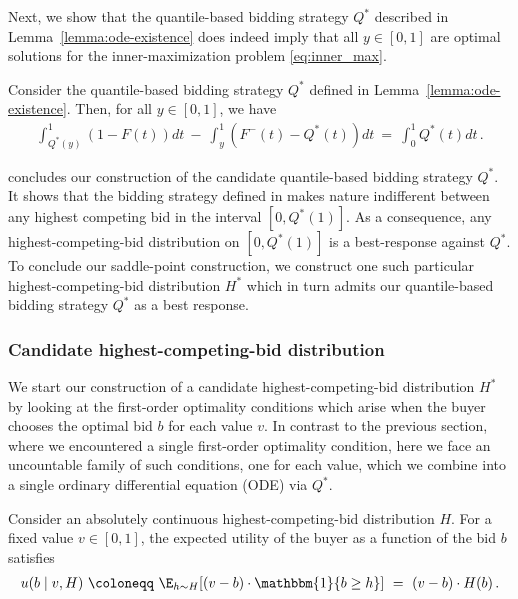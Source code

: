 Next, we show that the quantile-based bidding strategy $Q^*$ described in Lemma~\ref{lemma:ode-existence} does indeed imply that all $y \in [0,1]$ are optimal solutions for the inner-maximization problem \eqref{eq:inner_max}. 




\begin{lemma}\label{lemma:saddle-max-prob}
	Consider the quantile-based bidding strategy $Q^*$ defined in Lemma~\ref{lemma:ode-existence}. Then, for all $y \in [0,1]$, we have
	\begin{align*}
		\int_{Q^*(y)}^1 (1 - F(t)) dt\ -\ \int_y^1 (F^-(t) - Q^*(t)) dt\ =\ \int_0^1 Q^*(t) dt\,.
	\end{align*} 
\end{lemma}
 concludes our construction of the candidate quantile-based bidding strategy $Q^*$. It shows that the bidding strategy defined in  makes nature indifferent between any highest competing bid in the interval $[0,Q^*(1)]$. As a consequence, any highest-competing-bid distribution on $[0,Q^*(1)]$ is a best-response against $Q^*$. To conclude our saddle-point construction, we construct one such particular highest-competing-bid distribution $H^*$ which in turn admits our quantile-based bidding strategy $Q^*$ as a best response.

\subsubsection{Candidate highest-competing-bid distribution}\label{sec:construct_H}

We start our construction of a candidate highest-competing-bid distribution $H^*$ by looking at the first-order optimality conditions which arise when the
buyer chooses the optimal bid $b$ for each value $v$. In contrast to the previous section, where we encountered a single first-order optimality condition, here we face an uncountable family of such conditions, one for each value, which we combine into a single ordinary differential equation (ODE) via $Q^*$.
 
Consider an absolutely continuous highest-competing-bid distribution $H$. For a fixed value $v \in [0,1]$, the expected utility of the buyer as a function of the bid $b$ satisfies
\begin{align*}
	u(b \mid v,H)\ \coloneqq\ \E_{h \sim H}[(v - b) \cdot \mathbbm{1} \{ b \geq h\}]\ =\ (v-b) \cdot H(b)\,.
\end{align*}

